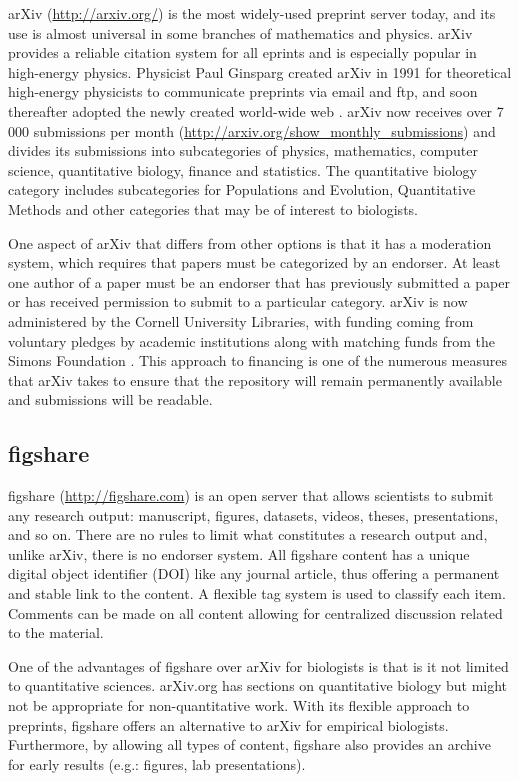 \documentclass[letterpaper,twocolumn,superscriptaddress,showkeys,longbibliography]{revtex4-1}
\begin{document}
arXiv (\url{http://arxiv.org/}) is the most widely-used preprint server today,
and its use is almost universal in some branches of mathematics and physics.
arXiv provides a reliable citation system for all eprints and is especially
popular in high-energy physics. Physicist Paul Ginsparg created arXiv in 1991
for theoretical high-energy physicists to communicate preprints via email and
ftp, and soon thereafter adopted the newly created world-wide
web \cite{jackson2002preprints}.  arXiv now receives over 7 000 submissions per
month (\url{http://arxiv.org/show_monthly_submissions}) and divides its
submissions into subcategories of physics, mathematics, computer science,
quantitative biology, finance and statistics.  The quantitative biology category
includes subcategories for Populations and Evolution, Quantitative Methods and
other categories that may be of interest to biologists.

One aspect of arXiv that differs from other options is that it has a moderation
system, which requires that papers must be categorized by an endorser.
At least one author of a paper must be an endorser that has previously submitted
a paper or has received permission to submit to a particular category. arXiv is now
administered by the Cornell University Libraries, with funding coming from
voluntary pledges by academic institutions along with matching funds from the
Simons Foundation \cite{arxiv_future}. This approach to financing is one of
the numerous measures that arXiv takes to ensure that the repository will remain
permanently available and submissions will be readable.

\subsection{figshare}

figshare (\href{http://figshare.com}{http://figshare.com}) is an open server
that allows scientists to submit any research output: manuscript, figures,
datasets, videos, theses, presentations, and so on. There are no rules to limit
what constitutes a research output and, unlike arXiv, there is no endorser
system. All figshare content has a unique digital object identifier (DOI) like
any journal article, thus offering a permanent and stable link to the content.
A flexible tag system is used to classify each item. Comments can be made on all
content allowing for centralized discussion related to the material.

One of the advantages of figshare over arXiv for biologists is that is it not
limited to quantitative sciences. arXiv.org has sections on quantitative biology
but might not be appropriate for non-quantitative work. With its flexible
approach to preprints, figshare offers an alternative to arXiv for empirical
biologists. Furthermore, by allowing all types of content, figshare also
provides an archive for early results (e.g.: figures, lab presentations).
\end{document}
